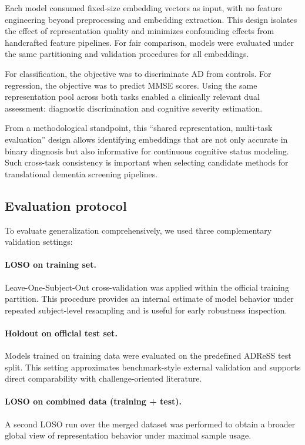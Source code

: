 \documentclass[final,5p,times]{elsarticle}
\begin{document}
Each model consumed fixed-size embedding vectors as input, with no feature engineering beyond preprocessing and embedding extraction. This design isolates the effect of representation quality and minimizes confounding effects from handcrafted feature pipelines. For fair comparison, models were evaluated under the same partitioning and validation procedures for all embeddings.

For classification, the objective was to discriminate AD from controls. For regression, the objective was to predict MMSE scores. Using the same representation pool across both tasks enabled a clinically relevant dual assessment: diagnostic discrimination and cognitive severity estimation.

From a methodological standpoint, this “shared representation, multi-task evaluation” design allows identifying embeddings that are not only accurate in binary diagnosis but also informative for continuous cognitive status modeling. Such cross-task consistency is important when selecting candidate methods for translational dementia screening pipelines.

\subsection{Evaluation protocol}

To evaluate generalization comprehensively, we used three complementary validation settings:

\paragraph{LOSO on training set.}
Leave-One-Subject-Out cross-validation was applied within the official training partition. This procedure provides an internal estimate of model behavior under repeated subject-level resampling and is useful for early robustness inspection.

\paragraph{Holdout on official test set.}
Models trained on training data were evaluated on the predefined ADReSS test split. This setting approximates benchmark-style external validation and supports direct comparability with challenge-oriented literature.

\paragraph{LOSO on combined data (training + test).}
A second LOSO run over the merged dataset was performed to obtain a broader global view of representation behavior under maximal sample usage.
\end{document}
